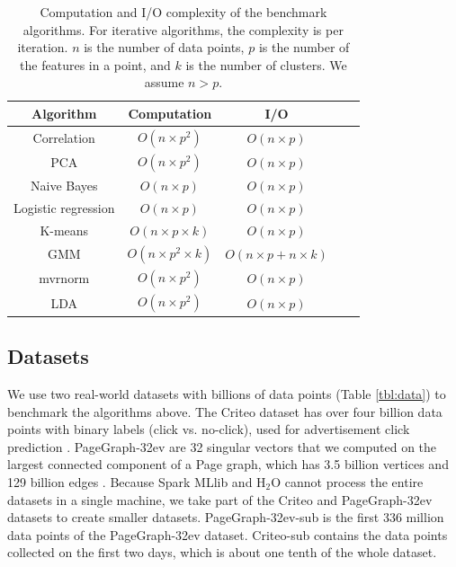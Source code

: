 \begin{table}
\begin{center}
\caption{Computation and I/O complexity of the benchmark algorithms. For
	iterative algorithms, the complexity is per iteration. $n$ is the number
	of data points, $p$ is the number of the features in a point, and $k$ is
	the number of clusters. We assume $n > p$.
}
\vspace{-10pt}
\footnotesize
\begin{tabular}{|c|c|c|c|c|}
\hline
Algorithm & Computation & I/O \\
\hline
Correlation & $O(n \times p^2)$ & $O(n \times p)$ \\
\hline
PCA & $O(n \times p^2)$ & $O(n \times p)$ \\
\hline
Naive Bayes & $O(n \times p)$ & $O(n \times p)$ \\
\hline
Logistic regression & $O(n \times p)$ & $O(n \times p)$ \\
\hline
K-means & $O(n \times p \times k)$ & $O(n \times p)$ \\
\hline
GMM & $O(n \times p^2 \times k)$ & $O(n \times p + n \times k)$ \\
\hline
mvrnorm & $O(n \times p^2)$ & $O(n \times p)$ \\
\hline
LDA & $O(n \times p^2)$ & $O(n \times p)$ \\
\hline
\end{tabular}
\normalsize
\label{tbl:algs}
\end{center}
\vspace{-10pt}
\end{table}

\subsection{Datasets}\label{sec:data}
We use two real-world datasets with billions of data points (Table \ref{tbl:data})
to benchmark the algorithms above. The Criteo dataset has over four billion data
points with binary labels (click vs. no-click), used for advertisement click
prediction \cite{criteo}. PageGraph-32ev are 32 singular vectors that we computed
on the largest connected component of a Page graph, which has 3.5 billion vertices and
129 billion edges \cite{webgraph}. Because Spark MLlib and H$_2$O cannot process
the entire datasets in a single machine, we take part of the Criteo and
PageGraph-32ev datasets to create smaller datasets.
PageGraph-32ev-sub is the first 336 million data points
of the PageGraph-32ev dataset. Criteo-sub contains the data points collected
on the first two days, which is about one tenth of the whole dataset.

